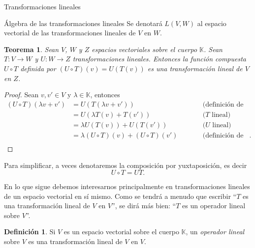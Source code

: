 \documentclass[a4paper,12pt,twoside,spanish,reqno]{amsbook}
\newtheorem{teorema}{Teorema}[section]
\theoremstyle{definition}
\newtheorem{definicion}{Definici\'on}[section]
\theoremstyle{remark}
\newcommand{\K}{\mathbb K}
\begin{document}
\begin{chapter}{Transformaciones lineales}
\begin{section}{Álgebra de las transformaciones lineales}
        Se denotará  $L(V,W)$ al espacio vectorial de las transformaciones lineales de $V$ en $W$.
        
        \begin{teorema}\label{th-6-hoffman}
            Sean $V$, $W$ y $Z$ espacios vectoriales sobre el cuerpo $\K$.  Sean $T: V \to W$ y $U: W \to Z$ 
            transformaciones lineales. Entonces la función compuesta $U\circ T$ definida por $(U\circ T)(v) = U(T(v))$ es una transformación lineal de $V$ en $Z$.
        \end{teorema} 
        \begin{proof} Sean $v, v' \in V$ y $\lambda \in \K$, entonces
            \begin{equation*}
            \begin{array}{rlll}
                (U\circ T)(\lambda v + v') &= U(T(\lambda v + v'))&\qquad&\text{(definición de composición)} \\
                 &= U(\lambda T( v) + T(v'))&\qquad&\text{($T$ lineal)} \\
                 &= \lambda U(T( v)) + U(T(v'))&\qquad&\text{($U$ lineal)} \\
                 &= \lambda (U\circ T)( v) + (U\circ T)(v')&\qquad&\text{(definición de composición)}. \\
            \end{array}
            \end{equation*}
            
        \end{proof}
        
        Para simplificar, a veces  denotaremos la composición por yuxtaposición,  es decir $$U\circ T = U T.$$
        
        
        En lo que sigue debemos interesarnos principalmente en transformaciones lineales de un espacio vectorial en sí mismo. Como se tendrá a menudo que 	escribir ``$T$ es una transformación lineal de $V$ en $V$'', se dirá más bien: ``$T$ es un operador lineal sobre $V$''. 
        
        \begin{definicion}
            Si $V$ es un espacio vectorial sobre el cuerpo $\K$, un \textit{operador lineal} sobre $V$ es una transformación lineal de $V$ en $V$.
        \end{definicion}
        

\end{section}
\end{chapter}
\end{document}
